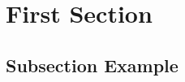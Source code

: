 \documentclass{beamer}
\title[]{} %
\author{D.D., A.R.} %
\institute[] %
{ \\ %
\medskip
\textit{} %
}
\date{\today} %
\begin{document}



\section{First Section} %

\subsection{Subsection Example} %
\end{document}
